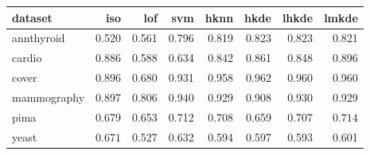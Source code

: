 \begin{tabular}{l|rrr|rrrr}
  \toprule
dataset & iso & lof & svm & hknn & hkde & lhkde & lmkde \\ 
  \midrule
  annthyroid & 0.520 & 0.561 & 0.796 & 0.819 & $\bm{0.823}$ & $\bm{0.823}$ & 0.821 \\ 
  cardio & 0.886 & 0.588 & 0.634 & 0.842 & 0.861 & 0.848 & $\bm{0.896}$ \\ 
  cover & 0.896 & 0.680 & 0.931 & 0.958 & $\bm{0.962}$ & 0.960 & 0.960 \\ 
  mammography & 0.897 & 0.806 & $\bm{0.940}$ & 0.929 & 0.908 & 0.930 & 0.929 \\ 
  pima & 0.679 & 0.653 & 0.712 & 0.708 & 0.659 & 0.707 & $\bm{0.714}$ \\ 
  yeast & $\bm{0.671}$ & 0.527 & 0.632 & 0.594 & 0.597 & 0.593 & 0.601 \\ 
   \bottomrule
\end{tabular}
